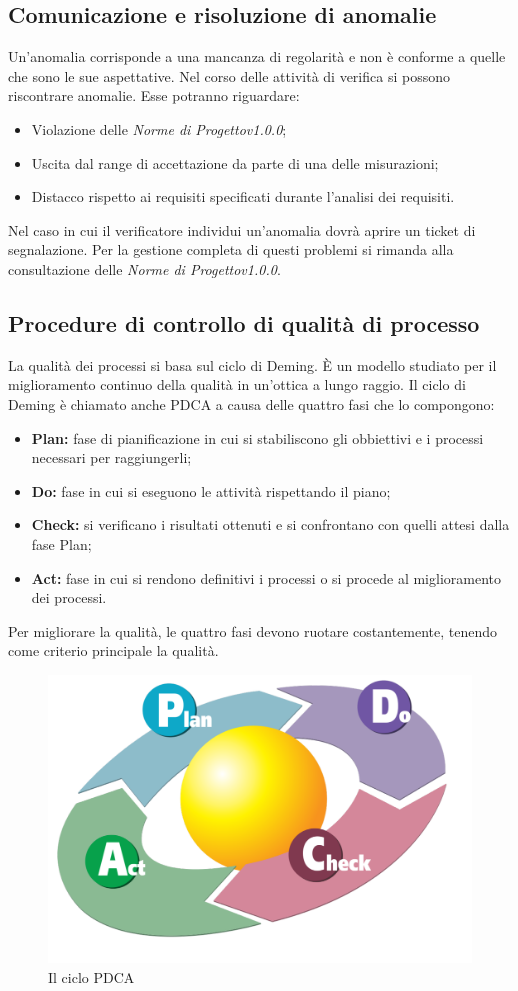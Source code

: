 \subsection{Comunicazione e risoluzione di anomalie}
Un'anomalia corrisponde a una mancanza di regolarità e non è conforme a quelle che sono le sue aspettative. Nel corso delle attività di verifica si possono riscontrare anomalie. Esse potranno riguardare:
\begin{itemize}
	\item Violazione delle \textit{Norme di Progettov1.0.0};
	\item Uscita dal range di accettazione da parte di una delle misurazioni;
	\item Distacco rispetto ai requisiti specificati durante l'analisi dei requisiti.
\end{itemize}
Nel caso in cui il verificatore individui un'anomalia dovrà aprire un ticket di segnalazione. Per la gestione completa di questi problemi si rimanda alla consultazione delle \textit{Norme di Progettov1.0.0}.

\subsection{Procedure di controllo di qualità di processo}
La qualità dei processi si basa sul ciclo di Deming. È un modello studiato per il miglioramento continuo della qualità in un'ottica a lungo raggio.
Il ciclo di Deming è chiamato anche PDCA a causa delle quattro fasi che lo compongono:
\begin{itemize}
	\item \textbf{Plan:} fase di pianificazione in cui si stabiliscono gli obbiettivi e i processi necessari per raggiungerli;
	\item \textbf{Do:} fase in cui si eseguono le attività rispettando il piano;
	\item \textbf{Check:} si verificano i risultati ottenuti e si confrontano con quelli attesi dalla fase Plan;
	\item \textbf{Act:} fase in cui si rendono definitivi i processi o si procede al miglioramento dei processi. 
\end{itemize}
Per migliorare la qualità, le quattro fasi devono ruotare costantemente, tenendo come criterio principale la qualità.
\begin{figure}[h]
\centering
\includegraphics[width=0.7\linewidth]{img/PDCA_Cycle}
\caption[Il ciclo PDCA]{Il ciclo PDCA}
\label{fig:PDCA_Cycle}
\end{figure}

